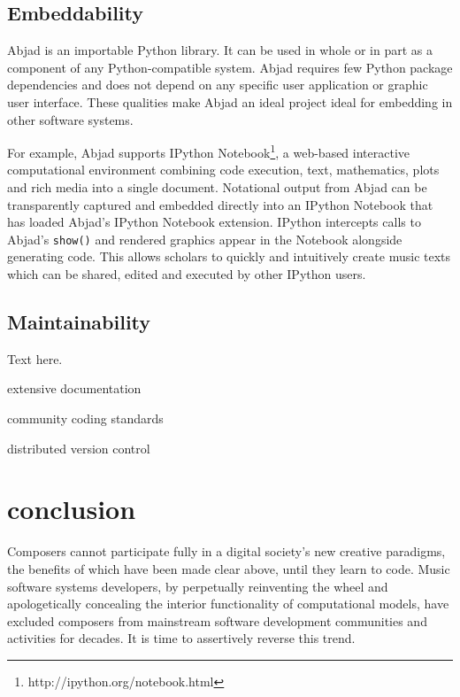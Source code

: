 \documentclass{article}
\begin{document}
\subsection{Embeddability}

Abjad is an importable Python library. It can be used in whole or in part as a
component of any Python-compatible system. Abjad requires few Python package
dependencies and does not depend on any specific user application or graphic
user interface. These qualities make Abjad an ideal project ideal for embedding
in other software systems.

For example, Abjad supports IPython
Notebook\footnote{http://ipython.org/notebook.html}, a web-based interactive
computational environment combining code execution, text, mathematics, plots
and rich media into a single document. Notational output from Abjad can be
transparently captured and embedded directly into an IPython Notebook that has
loaded Abjad's IPython Notebook extension. IPython intercepts calls to Abjad's
\texttt{show()} and rendered graphics appear in the Notebook alongside
generating code. This allows scholars to quickly and intuitively create music
texts which can be shared, edited and executed by other IPython users.

\subsection{Maintainability}

Text here.

extensive documentation

community coding standards

distributed version control

\section{conclusion} \label{sec:conclusion}

Composers cannot participate fully in a digital society's new creative
paradigms, the benefits of which have been made clear above, until they learn
to code. Music software systems developers, by perpetually reinventing the
wheel and apologetically concealing the interior functionality of computational
models, have excluded composers from mainstream software development
communities and activities for decades. It is time to assertively reverse this
trend.


\end{document}
